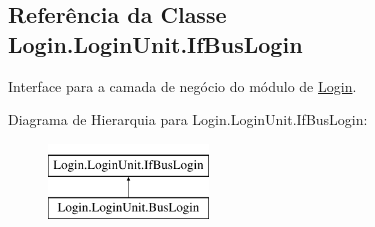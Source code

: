 \hypertarget{classLogin_1_1LoginUnit_1_1IfBusLogin}{}\subsection{Referência da Classe Login.\+Login\+Unit.\+If\+Bus\+Login}
\label{classLogin_1_1LoginUnit_1_1IfBusLogin}


Interface para a camada de negócio do módulo de \hyperlink{namespaceLogin}{Login}.  


Diagrama de Hierarquia para Login.\+Login\+Unit.\+If\+Bus\+Login\+:\begin{figure}[H]
\begin{center}
\leavevmode
\includegraphics[height=2.000000cm]{dc/dd6/classLogin_1_1LoginUnit_1_1IfBusLogin}
\end{center}
\end{figure}
